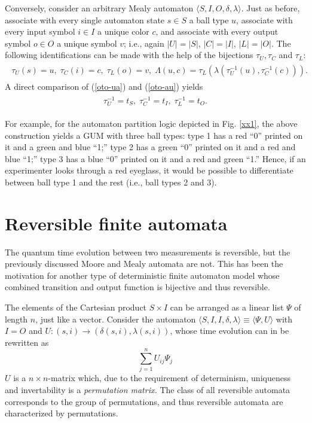 Conversely,
consider an arbitrary Mealy automaton $\langle S,I,O,\delta ,\lambda \rangle$.
Just as before, associate with every single automaton state $s\in S$
a ball type $u$,
associate with every input symbol $i\in I$
a unique color $c$,
and
associate with every output symbol $o\in O$
a unique symbol $v$; i.e., again
$\vert U\vert =\vert S\vert$,
$\vert C\vert =\vert I\vert$,
$\vert L\vert =\vert O\vert$.
The following identifications can be made
with the help of  the bijections $\tau_U,\tau_C$ and $\tau_L$:
\begin{eqnarray}
\begin{array}{llllll}
\tau_U(s)=u, \; \tau_C(i)=c, \;  \tau_L(o)=v, \;
\Lambda  (u,c) = \tau_L (\lambda (\tau_U^{-1}(u),\tau_C^{-1}(c))).
\end{array}
\label{oto-au}
\end{eqnarray}
A direct comparison of
(\ref{oto-ua})
and
(\ref{oto-au})
yields
\begin{eqnarray}
\begin{array}{llllll}
\tau_U^{-1}=t_S, \; \tau_C^{-1}=t_I, \;  \tau_L^{-1}=t_O.
\end{array}
\label{oto-oto}
\end{eqnarray}

For example, for the automaton partition logic
depicted in Fig. \ref{xx1}, the above  construction yields
a GUM with three ball types:
type 1 has a red ``0'' printed on it and a green and blue ``1;''
type 2 has a green ``0'' printed on it and a red and blue ``1;''
type 3 has a blue ``0'' printed on it and a red and green ``1.''
Hence, if an experimenter looks through a red eyeglass, it would be possible
to differentiate between
ball type 1 and the rest (i.e., ball types 2 and 3).

\section{Reversible finite automata}
The quantum time evolution between two measurements is reversible,
but the previously discussed Moore and Mealy automata are not.
This has been the motivation for another type of deterministic finite automaton
model \cite{sv-aut-rev,svozil-ql}
whose combined transition and output function is bijective and thus reversible.

The elements of the Cartesian product
$S\times I$ can be arranged as a linear list $\Psi$ of length
$n$, just like a vector.
Consider the automaton $\langle S,I,I,\delta ,\lambda \rangle \equiv \langle \Psi , U \rangle$
with
$I=O$ and $U:(s,i)\rightarrow (\delta(s,i),\lambda (s,i))$,
whose time evolution can in be rewritten as
\begin{equation}
\sum_{j=1}^n U_{ij}\Psi_j
\end{equation}
$U$ is a $n\times n$-matrix which, due to the requirement
of determinism, uniqueness and invertability is a {\em permutation matrix.}
The class of all reversible automata corresponds to the group of permutations,
and thus reversible automata are characterized by permutations.

